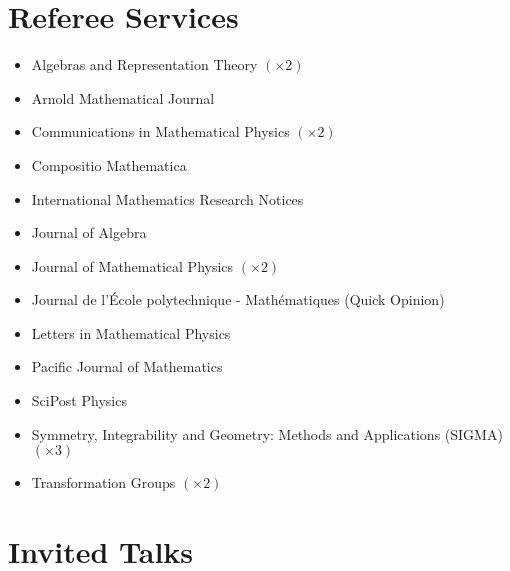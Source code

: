 \documentclass[11pt,letterpaper,roman,colorlinks,urlcolor=blue,linkcolor=blue
]{moderncv}
\begin{document}

\section{Referee Services}
\begin{itemize}[parsep=-0.2em, leftmargin=3.55cm]
    \item Algebras and Representation Theory $(\times 2)$
    \item Arnold Mathematical Journal
    \item Communications in Mathematical Physics $(\times 2)$
    \item Compositio Mathematica
    \item International Mathematics Research Notices
    \item Journal of Algebra
    \item Journal of Mathematical Physics $(\times 2)$
    \item Journal de l'École polytechnique - Mathématiques (Quick Opinion)
    \item Letters in Mathematical Physics
    \item Pacific Journal of Mathematics
    \item SciPost Physics
    \item Symmetry, Integrability and Geometry: Methods and Applications (SIGMA) $(\times 3)$
    \item Transformation Groups $(\times 2)$
\end{itemize}



\section{Invited Talks}
\end{document}
